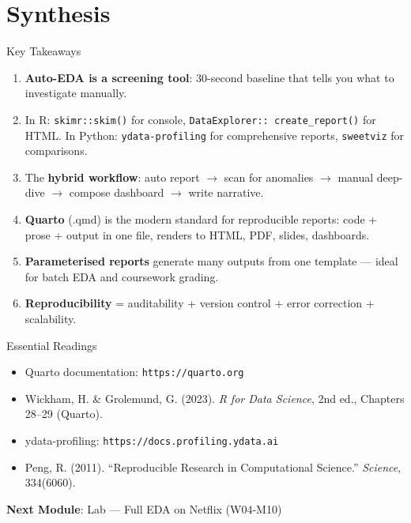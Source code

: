 \documentclass[10pt]{beamer}
\begin{document}
\section{Synthesis}

\begin{frame}{Key Takeaways}
  \begin{enumerate}
    \item \textbf{Auto-EDA is a screening tool}: 30-second baseline that
          tells you what to investigate manually.
    \item In R: \texttt{skimr::skim()} for console, \texttt{DataExplorer::
          create\_report()} for HTML. In Python: \texttt{ydata-profiling}
          for comprehensive reports, \texttt{sweetviz} for comparisons.
    \item The \textbf{hybrid workflow}: auto report $\rightarrow$ scan
          for anomalies $\rightarrow$ manual deep-dive $\rightarrow$
          compose dashboard $\rightarrow$ write narrative.
    \item \textbf{Quarto} (.qmd) is the modern standard for reproducible
          reports: code + prose + output in one file, renders to HTML,
          PDF, slides, dashboards.
    \item \textbf{Parameterised reports} generate many outputs from one
          template --- ideal for batch EDA and coursework grading.
    \item \textbf{Reproducibility} = auditability + version control +
          error correction + scalability.
  \end{enumerate}
\end{frame}

\begin{frame}{Essential Readings}
  \begin{itemize}
    \item Quarto documentation: \texttt{https://quarto.org}
    \item Wickham, H. \& Grolemund, G. (2023). \emph{R for Data Science},
          2nd ed., Chapters 28--29 (Quarto).
    \item ydata-profiling: \texttt{https://docs.profiling.ydata.ai}
    \item Peng, R. (2011). ``Reproducible Research in Computational
          Science.'' \emph{Science}, 334(6060).
  \end{itemize}
  \vspace{6pt}
  \textbf{Next Module}: Lab --- Full EDA on Netflix (W04-M10)
\end{frame}
\end{document}
